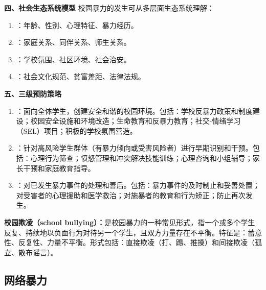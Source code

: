 \begin{keybox}
\textbf{四、社会生态系统模型}
校园暴力的发生可从多层面生态系统理解：
\begin{enumerate}[leftmargin=*]
    \item {}：年龄、性别、心理特征、暴力经历。
    \item {}：家庭关系、同伴关系、师生关系。
    \item {}：学校氛围、社区环境、社会治安。
    \item {}：社会文化规范、贫富差距、法律法规。
\end{enumerate}

\textbf{五、三级预防策略}
\begin{enumerate}[leftmargin=*]
    \item {}：面向全体学生，创建安全和谐的校园环境。包括：学校反暴力政策和制度建设；校园安全设施和环境改造；生命教育和反暴力教育；社交-情绪学习（SEL）项目；积极的学校氛围营造。
    \item {}：针对高风险学生群体（有暴力倾向或受害风险者）进行早期识别和干预。包括：心理行为筛查；愤怒管理和冲突解决技能训练；心理咨询和小组辅导；家长干预和家庭教育指导。
    \item {}：对已发生暴力事件的处理和善后。包括：暴力事件的及时制止和妥善处置；对受害者的心理援助和医学救治；对施暴者的教育和行为矫正；防止再次发生。
\end{enumerate}
\end{keybox}

\begin{defbox}
\textbf{校园欺凌（school bullying）：}是校园暴力的一种常见形式，指一个或多个学生反复、持续地以负面行为对待另一个学生，且双方力量存在不平衡。特征是：蓄意性、反复性、力量不平衡。形式包括：直接欺凌（打、踢、推搡）和间接欺凌（孤立、散布谣言）。
\end{defbox}

\subsection{网络暴力}

